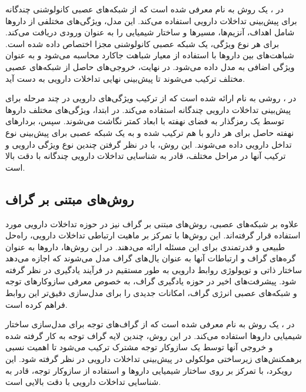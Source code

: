 در \cite{ref_asfand2024}، یک روش به نام  معرفی شده است که از شبکه‌های عصبی کانولوشنی چندگانه برای پیش‌بینی تداخلات دارویی استفاده می‌کند. این مدل، ویژگی‌های مختلفی از داروها شامل اهداف، آنزیم‌ها، مسیرها و ساختار شیمیایی را به عنوان ورودی دریافت می‌کند. برای هر نوع ویژگی، یک شبکه عصبی کانولوشنی مجزا اختصاص داده شده است. شباهت‌های بین داروها با استفاده از معیار شباهت جاکارد محاسبه می‌شود و به عنوان ویژگی اضافی به مدل داده می‌شود. در نهایت، خروجی‌های حاصل از شبکه‌های عصبی مختلف ترکیب می‌شوند تا پیش‌بینی نهایی تداخلات دارویی به دست آید.

در \cite{ref_lin2022}، روشی به نام  ارائه شده است که از ترکیب ویژگی‌های دارویی در چند مرحله برای پیش‌بینی تداخلات دارویی چندگانه استفاده می‌کند. در ابتدا، ویژگی‌های مختلف داروها توسط یک رمزگذار به فضای نهفته با ابعاد کمتر نگاشت می‌شوند. سپس، بردارهای نهفته حاصل برای هر دارو با هم ترکیب شده و به یک شبکه عصبی برای پیش‌بینی نوع تداخل دارویی داده می‌شوند. این روش، با در نظر گرفتن چندین نوع ویژگی دارویی و ترکیب آنها در مراحل مختلف، قادر به شناسایی تداخلات دارویی چندگانه با دقت بالا است.

\subsection{روش‌های مبتنی بر گراف}

علاوه بر شبکه‌های عصبی، روش‌های مبتنی بر گراف نیز در حوزه تداخلات دارویی مورد استفاده قرار گرفته‌اند. این روش‌ها با تمرکز بر ماهیت ارتباطی تداخلات دارویی، راه‌حل طبیعی و قدرتمندی برای این مسئله ارائه می‌دهند. در این روش‌ها، داروها به عنوان گره‌های گراف و ارتباطات آنها به عنوان یال‌های گراف مدل می‌شوند که اجازه می‌دهد ساختار ذاتی و توپولوژی روابط دارویی به طور مستقیم در فرآیند یادگیری در نظر گرفته شود. پیشرفت‌های اخیر در حوزه یادگیری گراف، به خصوص معرفی سازوکار‌های توجه و شبکه‌های عصبی انرژی گراف، امکانات جدیدی را برای مدل‌سازی دقیق‌تر این روابط فراهم کرده است.

در \cite{ref_nyamabo2021}، یک روش به نام  معرفی شده است که از گراف‌های توجه برای مدل‌سازی ساختار شیمیایی داروها استفاده می‌کند. در این روش، چندین لایه گراف توجه به کار گرفته شده و خروجی آنها توسط یک سازوکار توجه مشترک ترکیب می‌شود تا اهمیت نسبی برهمکنش‌های زیرساختی مولکولی در پیش‌بینی تداخلات دارویی در نظر گرفته شود. این رویکرد، با تمرکز بر روی ساختار شیمیایی داروها و استفاده از سازوکار توجه، قادر به شناسایی تداخلات دارویی با دقت بالایی است.


